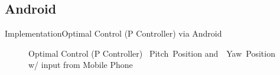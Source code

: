 \documentclass{beamer}
\begin{document}
\subsection{Android}
\begin{frame}{Implementation}{Optimal Control (P Controller) via Android}
    \begin{figure}
      \centering
      \caption{Optimal Control (P Controller) ~Pitch~Position and~~Yaw~Position w/ input from Mobile Phone}
      \label{fig:LQR_pos}
    \end{figure}
\end{frame}
\end{document}
